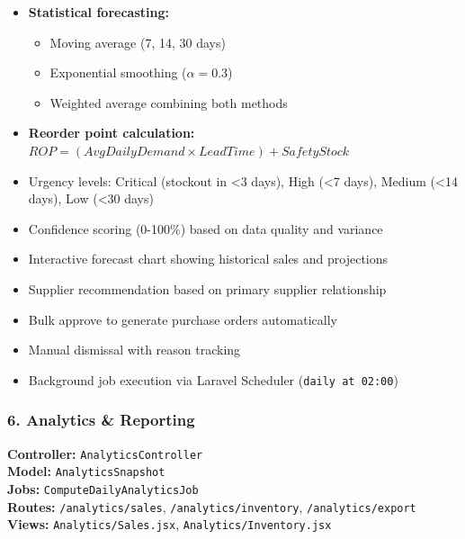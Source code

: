 \begin{itemize}
    \item \textbf{Statistical forecasting:}
    \begin{itemize}
        \item Moving average (7, 14, 30 days)
        \item Exponential smoothing ($\alpha = 0.3$)
        \item Weighted average combining both methods
    \end{itemize}
    \item \textbf{Reorder point calculation:} $ROP = (AvgDailyDemand \times LeadTime) + SafetyStock$
    \item Urgency levels: Critical (stockout in <3 days), High (<7 days), Medium (<14 days), Low (<30 days)
    \item Confidence scoring (0-100\%) based on data quality and variance
    \item Interactive forecast chart showing historical sales and projections
    \item Supplier recommendation based on primary supplier relationship
    \item Bulk approve to generate purchase orders automatically
    \item Manual dismissal with reason tracking
    \item Background job execution via Laravel Scheduler (\texttt{daily at 02:00})
\end{itemize}

\subsubsection{6. Analytics \& Reporting}

\textbf{Controller:} \texttt{AnalyticsController}\\
\textbf{Model:} \texttt{AnalyticsSnapshot}\\
\textbf{Jobs:} \texttt{ComputeDailyAnalyticsJob}\\
\textbf{Routes:} \texttt{/analytics/sales}, \texttt{/analytics/inventory}, \texttt{/analytics/export}\\
\textbf{Views:} \texttt{Analytics/Sales.jsx}, \texttt{Analytics/Inventory.jsx}

